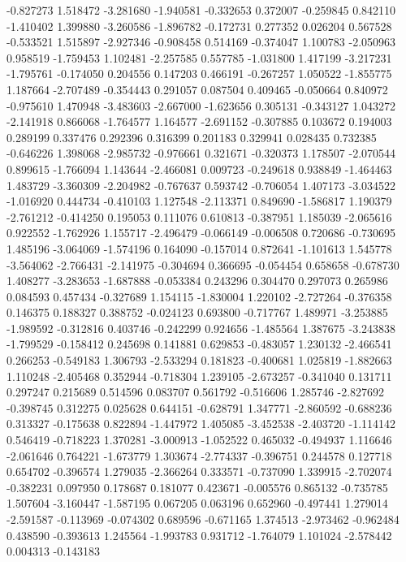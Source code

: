 -0.827273
1.518472
-3.281680
-1.940581
-0.332653
0.372007
-0.259845
0.842110
-1.410402
1.399880
-3.260586
-1.896782
-0.172731
0.277352
0.026204
0.567528
-0.533521
1.515897
-2.927346
-0.908458
0.514169
-0.374047
1.100783
-2.050963
0.958519
-1.759453
1.102481
-2.257585
0.557785
-1.031800
1.417199
-3.217231
-1.795761
-0.174050
0.204556
0.147203
0.466191
-0.267257
1.050522
-1.855775
1.187664
-2.707489
-0.354443
0.291057
0.087504
0.409465
-0.050664
0.840972
-0.975610
1.470948
-3.483603
-2.667000
-1.623656
0.305131
-0.343127
1.043272
-2.141918
0.866068
-1.764577
1.164577
-2.691152
-0.307885
0.103672
0.194003
0.289199
0.337476
0.292396
0.316399
0.201183
0.329941
0.028435
0.732385
-0.646226
1.398068
-2.985732
-0.976661
0.321671
-0.320373
1.178507
-2.070544
0.899615
-1.766094
1.143644
-2.466081
0.009723
-0.249618
0.938849
-1.464463
1.483729
-3.360309
-2.204982
-0.767637
0.593742
-0.706054
1.407173
-3.034522
-1.016920
0.444734
-0.410103
1.127548
-2.113371
0.849690
-1.586817
1.190379
-2.761212
-0.414250
0.195053
0.111076
0.610813
-0.387951
1.185039
-2.065616
0.922552
-1.762926
1.155717
-2.496479
-0.066149
-0.006508
0.720686
-0.730695
1.485196
-3.064069
-1.574196
0.164090
-0.157014
0.872641
-1.101613
1.545778
-3.564062
-2.766431
-2.141975
-0.304694
0.366695
-0.054454
0.658658
-0.678730
1.408277
-3.283653
-1.687888
-0.053384
0.243296
0.304470
0.297073
0.265986
0.084593
0.457434
-0.327689
1.154115
-1.830004
1.220102
-2.727264
-0.376358
0.146375
0.188327
0.388752
-0.024123
0.693800
-0.717767
1.489971
-3.253885
-1.989592
-0.312816
0.403746
-0.242299
0.924656
-1.485564
1.387675
-3.243838
-1.799529
-0.158412
0.245698
0.141881
0.629853
-0.483057
1.230132
-2.466541
0.266253
-0.549183
1.306793
-2.533294
0.181823
-0.400681
1.025819
-1.882663
1.110248
-2.405468
0.352944
-0.718304
1.239105
-2.673257
-0.341040
0.131711
0.297247
0.215689
0.514596
0.083707
0.561792
-0.516606
1.285746
-2.827692
-0.398745
0.312275
0.025628
0.644151
-0.628791
1.347771
-2.860592
-0.688236
0.313327
-0.175638
0.822894
-1.447972
1.405085
-3.452538
-2.403720
-1.114142
0.546419
-0.718223
1.370281
-3.000913
-1.052522
0.465032
-0.494937
1.116646
-2.061646
0.764221
-1.673779
1.303674
-2.774337
-0.396751
0.244578
0.127718
0.654702
-0.396574
1.279035
-2.366264
0.333571
-0.737090
1.339915
-2.702074
-0.382231
0.097950
0.178687
0.181077
0.423671
-0.005576
0.865132
-0.735785
1.507604
-3.160447
-1.587195
0.067205
0.063196
0.652960
-0.497441
1.279014
-2.591587
-0.113969
-0.074302
0.689596
-0.671165
1.374513
-2.973462
-0.962484
0.438590
-0.393613
1.245564
-1.993783
0.931712
-1.764079
1.101024
-2.578442
0.004313
-0.143183
